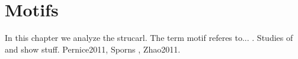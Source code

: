 

\section{Motifs}\label{sec:motifs}

In this chapter we analyze the strucarl. The term motif referes
to... . Studies of \textcite{Song2005} and \textcite{Perin2011} show
stuff. Pernice2011, Sporns , Zhao2011.



